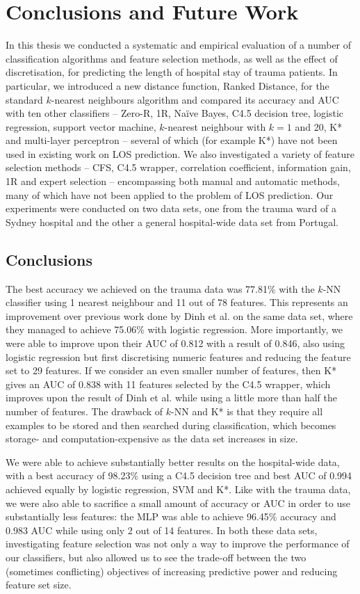 \chapter{Conclusions and Future Work} \label{chap:conclusion}

In this thesis we conducted a systematic and empirical evaluation of a number
of classification algorithms and feature selection methods, as well as the
effect of discretisation, for predicting the length of hospital stay of trauma
patients. In particular, we introduced a new distance function, Ranked
Distance, for the standard
$k$-nearest neighbours algorithm and compared its accuracy and AUC with ten
other classifiers -- Zero-R, 1R, Na\"{i}ve Bayes, C4.5 decision tree, logistic
regression, support vector machine, $k$-nearest neighbour with $k=1$ and 20,
K* and multi-layer perceptron -- several of which (for example K*) have not
been used in existing work on LOS prediction. We also investigated a variety of
feature selection methods -- CFS, C4.5 wrapper, correlation coefficient,
information gain, 1R and expert selection -- encompassing both manual and
automatic methods, many of which have not been applied to the problem of LOS
prediction. Our experiments were conducted on two data sets, one from the
trauma ward of a Sydney hospital and the other a general hospital-wide data
set from Portugal.

\section{Conclusions}
The best accuracy we achieved on the trauma data was 77.81\% with the $k$-NN
classifier using 1 nearest neighbour and 11 out of 78 features. This represents
an improvement over previous work done by Dinh et al. on the same data set,
where they managed to achieve 75.06\% with logistic regression. More
importantly, we were able to improve upon their AUC of 0.812 with a result of
0.846, also using logistic regression but first discretising numeric features
and reducing the feature set to 29 features.
If we consider an even smaller number of features, then K*
gives an AUC of 0.838 with 11 features selected by the C4.5 wrapper, which
improves upon the result of Dinh et al. while using a little more than half
the number of features. The drawback of $k$-NN and K* is that they require all
examples to be stored and then searched during classification, which becomes
storage- and computation-expensive as the data set increases in size.

We were able to achieve substantially better results on the hospital-wide data,
with a best accuracy of 98.23\% using a C4.5 decision tree and best AUC of
0.994 achieved equally by logistic regression, SVM and K*. Like with the
trauma data, we were also able to sacrifice a small amount of accuracy or AUC
in order to use substantially less features: the MLP was able to achieve
96.45\% accuracy and 0.983 AUC while using only 2 out of 14 features. In both
these data sets, investigating feature selection was not only a way to
improve the performance of our classifiers, but also allowed us to see the
trade-off between the two (sometimes conflicting) objectives of increasing
predictive power and reducing feature set size.

